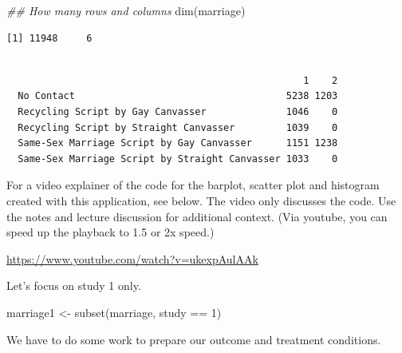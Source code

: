 \documentclass[
  letterpaper,
  DIV=11,
  numbers=noendperiod]{scrreprt}
\newenvironment{Shaded}{\begin{snugshade}}{\end{snugshade}}
\newcommand{\DecValTok}[1]{\textcolor[rgb]{0.68,0.00,0.00}{#1}}
\newcommand{\DocumentationTok}[1]{\textcolor[rgb]{0.37,0.37,0.37}{\textit{#1}}}
\newcommand{\FunctionTok}[1]{\textcolor[rgb]{0.28,0.35,0.67}{#1}}
\newcommand{\NormalTok}[1]{\textcolor[rgb]{0.00,0.23,0.31}{#1}}
\newcommand{\OtherTok}[1]{\textcolor[rgb]{0.00,0.23,0.31}{#1}}
\newcommand{\SpecialCharTok}[1]{\textcolor[rgb]{0.37,0.37,0.37}{#1}}
\begin{document}
\begin{Shaded}
\begin{Highlighting}[]
\DocumentationTok{\#\# How many rows and columns}
\FunctionTok{dim}\NormalTok{(marriage)}
\end{Highlighting}
\end{Shaded}

\begin{verbatim}
[1] 11948     6
\end{verbatim}

\begin{Shaded}
\end{Shaded}

\begin{verbatim}
                                                
                                                    1    2
  No Contact                                     5238 1203
  Recycling Script by Gay Canvasser              1046    0
  Recycling Script by Straight Canvasser         1039    0
  Same-Sex Marriage Script by Gay Canvasser      1151 1238
  Same-Sex Marriage Script by Straight Canvasser 1033    0
\end{verbatim}

For a video explainer of the code for the barplot, scatter plot and
histogram created with this application, see below. The video only
discusses the code. Use the notes and lecture discussion for additional
context. (Via youtube, you can speed up the playback to 1.5 or 2x
speed.)

\url{https://www.youtube.com/watch?v=ukexpAulAAk}

Let's focus on study 1 only.

\begin{Shaded}
\begin{Highlighting}[]
\NormalTok{marriage1 }\OtherTok{\textless{}{-}} \FunctionTok{subset}\NormalTok{(marriage, study }\SpecialCharTok{==}  \DecValTok{1}\NormalTok{)}
\end{Highlighting}
\end{Shaded}

We have to do some work to prepare our outcome and treatment conditions.
\end{document}
